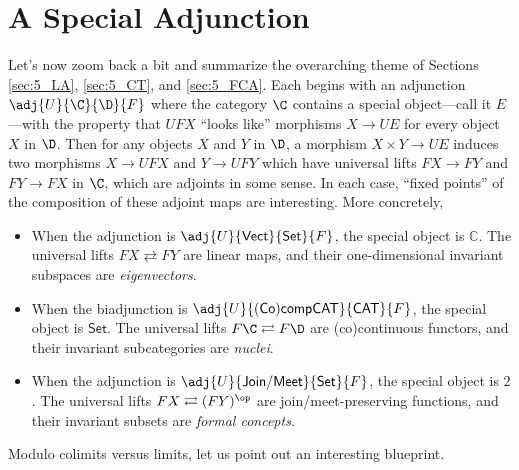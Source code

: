 



\section{A Special Adjunction}\label{sec:5behind} 
Let's now zoom back a bit and summarize the overarching theme of Sections \ref{sec:5_LA}, \ref{sec:5_CT}, and \ref{sec:5_FCA}. Each begins with an adjunction $\adj{U}{\C}{\D}{F}$ where the category $\C$ contains a special object---call it $E$---with the property that $UFX$ ``looks like'' morphisms $X\to UE$ for every object $X$ in $\D$. Then for any objects $X$ and $Y$ in $\D$, a morphism $X\times Y\to UE$ induces two morphisms $X\to UFX$ and $Y\to UFY$ which have universal lifts $FX\to FY$ and $FY\to FX$ in $\C$, which are adjoints in some sense. In each case, ``fixed points'' of the composition of these adjoint maps are interesting.  More concretely,
\begin{itemize}
  \item When the adjunction is $\adj{U}{\mathsf{Vect}}{\mathsf{Set}}{F}$, the special object is $\mathbb{C}$. The universal lifts $FX\rightleftarrows FY$ are linear maps, and their one-dimensional invariant subspaces are \emph{eigenvectors}.

  \item When the biadjunction is $\adj{U}{\mathsf{(Co)compCAT}}{\mathsf{CAT}}{F}$, the special object is $\mathsf{Set}$. The universal lifts $F\C\rightleftarrows F\D$ are (co)continuous functors, and their invariant subcategories are \emph{nuclei}.

  \item When the adjunction is $\adj{U}{\mathsf{Join/Meet}}{\mathsf{Set}}{F}$, the special object is $2$. The universal lifts $FX\rightleftarrows (FY)^{\op}$ are join/meet-preserving  functions, and their invariant subsets are \emph{formal concepts}.
\end{itemize}
Modulo colimits versus limits, let us point out an interesting blueprint.

